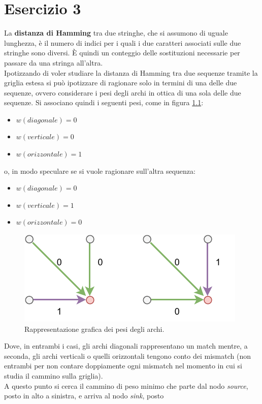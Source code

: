 \documentclass[a4paper,12pt, oneside]{book}
\begin{document}
\chapter{Esercizio 3}
La \textbf{distanza di Hamming} tra due stringhe, che si assumono di uguale
lunghezza, è 
il numero di indici per i quali i due caratteri associati sulle due stringhe
sono diversi. È quindi un conteggio delle sostituzioni necessarie per passare da
una stringa all'altra.\\
Ipotizzando di voler studiare la distanza di Hamming tra due sequenze tramite la
griglia estesa si può ipotizzare di ragionare solo in termini di una delle due
sequenze, ovvero considerare i pesi degli archi in ottica di una sola delle due
sequenze. Si associano quindi i seguenti pesi, come in figura \ref{fig:pes3}:
\begin{itemize}
  \item $w(diagonale)=0$
  \item $w(verticale)=0$
  \item $w(orizzontale)=1$
\end{itemize}
o, in modo speculare se si vuole ragionare sull'altra sequenza:
\begin{itemize}
  \item $w(diagonale)=0$
  \item $w(verticale)=1$
  \item $w(orizzontale)=0$
\end{itemize}
\begin{figure}
  \centering
  \includegraphics[scale = 1.2]{img/es31.pdf}
  \caption{Rappresentazione grafica dei pesi degli archi.}
  \label{fig:pes3}
\end{figure}
Dove, in entrambi i casi, gli archi diagonali rappresentano un match mentre, a
seconda, gli archi verticali o quelli orizzontali tengono conto dei mismatch
(non entrambi per non contare doppiamente ogni mismatch nel momento in cui si
studia il cammino sulla griglia).\\
A questo punto si cerca il cammino di peso minimo che parte dal nodo
\textit{source}, posto in alto a sinistra, e arriva al nodo \textit{sink}, posto
\end{document}
